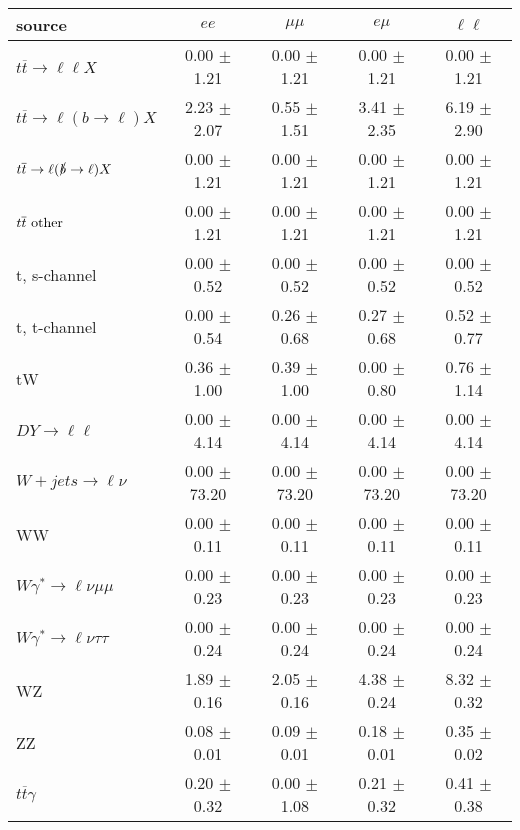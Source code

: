 \begin{tabular}{l|cccc} \hline\hline
source & $ee$ & $\mu\mu$ & $e\mu$ & $\ell\ell $ \\
\hline
$t\overline{t} \rightarrow \ell \ell X$ &  0.00 $\pm$  1.21 &  0.00 $\pm$  1.21 &  0.00 $\pm$  1.21 &  0.00 $\pm$  1.21 \\
$t\overline{t} \rightarrow \ell (b \rightarrow \ell) X$ &  2.23 $\pm$  2.07 &  0.55 $\pm$  1.51 &  3.41 $\pm$  2.35 &  6.19 $\pm$  2.90 \\
$t\overline{t} \rightarrow \ell (\slashed b \rightarrow \ell) X$ &  0.00 $\pm$  1.21 &  0.00 $\pm$  1.21 &  0.00 $\pm$  1.21 &  0.00 $\pm$  1.21 \\
        $t\overline{t}\ \rm{other}$ &  0.00 $\pm$  1.21 &  0.00 $\pm$  1.21 &  0.00 $\pm$  1.21 &  0.00 $\pm$  1.21 \\
\hline
                       t, s-channel &  0.00 $\pm$  0.52 &  0.00 $\pm$  0.52 &  0.00 $\pm$  0.52 &  0.00 $\pm$  0.52 \\
                       t, t-channel &  0.00 $\pm$  0.54 &  0.26 $\pm$  0.68 &  0.27 $\pm$  0.68 &  0.52 $\pm$  0.77 \\
                                 tW &  0.36 $\pm$  1.00 &  0.39 $\pm$  1.00 &  0.00 $\pm$  0.80 &  0.76 $\pm$  1.14 \\
\hline
         $DY \rightarrow \ell \ell$ &  0.00 $\pm$  4.14 &  0.00 $\pm$  4.14 &  0.00 $\pm$  4.14 &  0.00 $\pm$  4.14 \\
      $W+jets \rightarrow \ell \nu$ &  0.00 $\pm$ 73.20 &  0.00 $\pm$ 73.20 &  0.00 $\pm$ 73.20 &  0.00 $\pm$ 73.20 \\
                                 WW &  0.00 $\pm$  0.11 &  0.00 $\pm$  0.11 &  0.00 $\pm$  0.11 &  0.00 $\pm$  0.11 \\
\hline
$W\gamma^{*} \rightarrow \ell \nu \mu\mu$ &  0.00 $\pm$  0.23 &  0.00 $\pm$  0.23 &  0.00 $\pm$  0.23 &  0.00 $\pm$  0.23 \\
$W\gamma^{*} \rightarrow \ell \nu \tau\tau$ &  0.00 $\pm$  0.24 &  0.00 $\pm$  0.24 &  0.00 $\pm$  0.24 &  0.00 $\pm$  0.24 \\
                                 WZ &  1.89 $\pm$  0.16 &  2.05 $\pm$  0.16 &  4.38 $\pm$  0.24 &  8.32 $\pm$  0.32 \\
                                 ZZ &  0.08 $\pm$  0.01 &  0.09 $\pm$  0.01 &  0.18 $\pm$  0.01 &  0.35 $\pm$  0.02 \\
\hline
              $t\overline{t}\gamma$ &  0.20 $\pm$  0.32 &  0.00 $\pm$  1.08 &  0.21 $\pm$  0.32 &  0.41 $\pm$  0.38 \\

\end{tabular}
